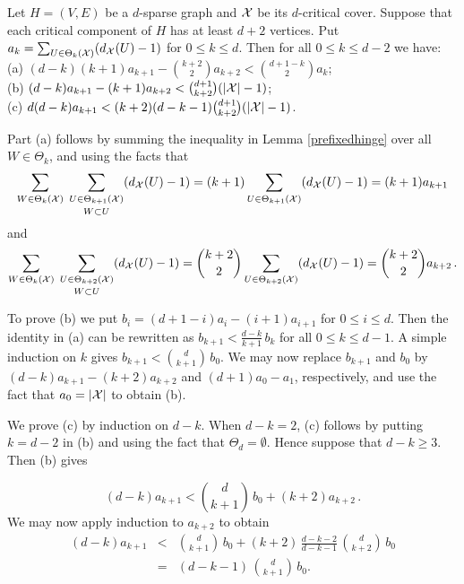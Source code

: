 \documentclass[11pt]{article}
\begin{document}
\begin{lemma}\label{fixedhinge}
Let $H=(V,E)$ be a $d$-sparse graph and $\cal X$ be its $d$-critical
cover. Suppose that each
critical component of $H$ has at least $d+2$ vertices. Put
$a_k=\sum_{U\in\Theta_k({\cal X})}(d_{\cal X}(U)-1)$ for  $0\leq k\leq d$.
Then
for all $0\leq k\leq d-2$ we have:\\[2mm]
(a) $(d-k)(k+1)a_{k+1}-{{k+2}\choose{2}}a_{k+2}
<{{d+1-k}\choose{2}}a_{k}$;
\\[2mm]
(b) $(d-k)a_{k+1}- (k+1)a_{k+2} <{{d+1}\choose{k+2}}(|{\cal X}|-1)$;
\\[2mm]
(c) $d(d-k)a_{k+1} <(k+2)(d-k-1){{d+1}\choose{k+2}}(|{\cal X}|-1)$.
\end{lemma}
\bproof Part (a) follows by summing the inequality in Lemma
\ref{prefixedhinge} over all $W\in \Theta_k$, and using the facts
that
$$\sum_{W\in \Theta_k({\cal X})} \;\sum_{\substack{U\in\Theta_{k+1}({\cal X})\\[0.7mm]W\subset
U}}(d_{\cal X}(U)-1)=(k+1)\sum_{U\in\Theta_{k+1}({\cal X})}(d_{\cal X}(U)-1)=(k+1)a_{k+1}$$
and
$$\sum_{W\in \Theta_k({\cal X})} \;\sum_{\substack{U\in\Theta_{k+2}({\cal X})\\[0.7mm]W\subset
U}}(d_{\cal X}(U)-1)={{k+2}\choose{2}}\sum_{U\in\Theta_{k+2}({\cal X})}(d_{\cal X}(U)-1)={{k+2}\choose{2}}a_{k+2}\,.$$

\iffalse

To prove (b) we put  $b_i=(d+1-i)a_i-(i+1)a_{i+1}$  for $0\leq i\leq
d$. Then the identity in (a) can be rewritten as
$b_{k+1}<\frac{d-k}{k+1}\,b_k$ for all $0\leq k\leq d-1$. A simple
induction on $k$ gives $b_{k+1}<{{d}\choose{k+1}}\,b_0$. We may now
replace $b_{k+1}$ and $b_0$ by $(d-k)a_{k+1}-(k+2)a_{k+2}$ and
$(d+1)a_{0}-a_{1}$, respectively, and use the fact that
$a_0=|{\cal X}|$ to obtain (b).

We prove (c) by induction on $d-k$. When $d-k=2$, (c) follows by
putting $k=d-2$ in (b) and using the fact that $\Theta_d=\emptyset$.
Hence suppose that $d-k\geq 3$. Then (b) gives


$$(d-k)a_{k+1}<\mbox{${{d}\choose{k+1}}$}\,b_0+(k+2)a_{k+2}\,.
$$
We may now apply induction to $a_{k+2}$ to obtain
\begin{eqnarray*}
(d-k)a_{k+1} &<& \mbox{${{d}\choose{k+1}}$}\,b_0+
(k+2)\,\mbox{$\frac{d-k-2}{d-k-1}\,{{d}\choose{k+2}}$}\,b_0\\[1mm]
&=& (d-k-1)\,\mbox{${{d}\choose{k+1}}$}\,b_0.
\end{eqnarray*}
\end{document}
